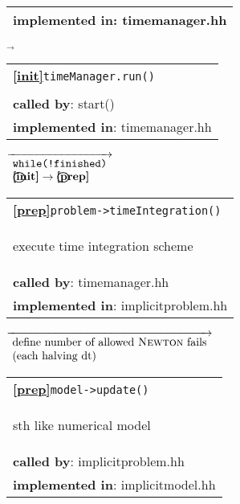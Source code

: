 \begin{landscape}
{\begin{tabular}{|l|}
    \textbf{implemented in}: timemanager.hh \\
    \hline
  \end{tabular}
    $\overrightarrow{}$
  \begin{tabular}{|l|}\hline
    \textbf{\textcircled{\ref{init}}}\verb+timeManager.run()+\\
    \begin{scriptsize}\end{scriptsize}\\
    \textbf{called by}: {start()}\\
    \textbf{implemented in}: {timemanager.hh}\\
    \hline
  \end{tabular}
{\scriptsize
    $\overrightarrow{ %
      \begin{array}{l} %
	\textnormal{\texttt{while(!finished)}}\\
	\textbf{\textbf{\textcircled{\ref{init}}}} \rightarrow \textbf{\textcircled{\ref{prep}} }
      \end{array}
    }$}
  \begin{tabular}{|l|}
    \hline
    \textbf{\textcircled{\ref{prep}}}\verb+problem->timeIntegration()+ \\
    \begin{scriptsize}execute time integration scheme \end{scriptsize}\\
    \textbf{called by}: timemanager.hh\\
    \textbf{implemented in}: implicitproblem.hh\\
\hline
  \end{tabular}
\nextline
    {\scriptsize$\overrightarrow{
      \begin{array}{l}
	\textnormal{define number of allowed \textsc{Newton} fails} \\
	\textnormal{(each halving dt)}
      \end{array}
    }$}
      \begin{tabular}{|l|}
    \hline
    \textbf{\textcircled{\ref{prep}}}\verb+model->update()+ \\
    \begin{scriptsize}sth like numerical model\end{scriptsize}\\
    \textbf{called by}: implicitproblem.hh\\
    \textbf{implemented in}: implicitmodel.hh\\

\end{tabular}}
\end{landscape}

